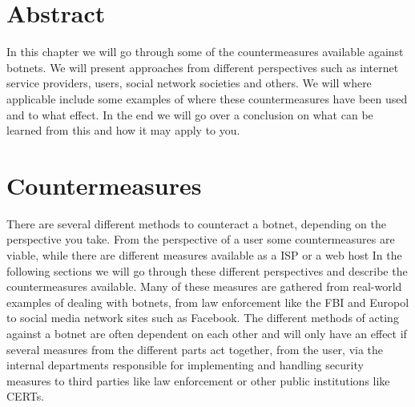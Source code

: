 \section{Abstract}
In this chapter we will go through some of the countermeasures available against botnets.
We will present approaches from different perspectives such as internet service providers, users, social network societies and others. We will where applicable include some examples of where these countermeasures have been used and to what effect.
In the end we will go over a conclusion on what can be learned from this and how it may apply to you.






\section{Countermeasures}
There are several different methods to counteract a botnet, depending on the perspective you take.
From the perspective of a user some countermeasures are viable, while there are different measures available as a ISP or a web host
In the following sections we will go through these different perspectives and describe the countermeasures available.
Many of these measures are gathered from real-world examples of dealing with botnets, from law enforcement like the FBI and Europol to social media network sites such as Facebook.
The different methods of acting against a botnet are often dependent on each other and will only have an effect if several measures from the different parts act together, from the user, via the internal departments responsible for implementing and handling security measures to third parties like law enforcement or other public institutions like CERTs.

